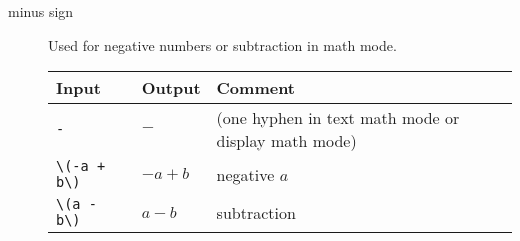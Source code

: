 \begin{description}
  \item[minus sign]
    Used for negative numbers or subtraction in math mode.
    \begin{singlespace}
      \begin{tabular}{@{}lll@{}}
        \toprule
        \bfseries Input& \bfseries Output& \bfseries Comment\\
        \midrule
        \verb+-+& \(-\)& (one hyphen in text math mode or display math mode)\\
        \verb=\(-a + b\)=& \(-a + b\)& negative $a$\\
        \verb+\(a - b\)+& \(a - b\)& subtraction\\
        \bottomrule
      \end{tabular}
    \end{singlespace}

\end{description}

